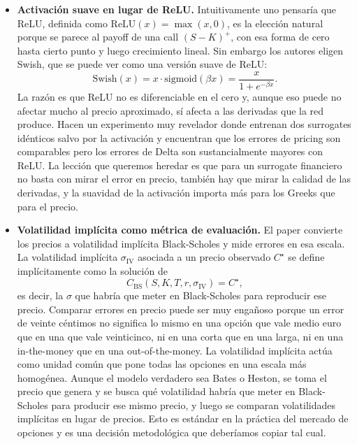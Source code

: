 \documentclass[11pt,a4paper]{article}
\begin{document}
\begin{itemize}
\item \textbf{Activación suave en lugar de ReLU.} Intuitivamente uno pensaría que ReLU, definida como $\mathrm{ReLU}(x) = \max(x, 0)$, es la elección natural porque se parece al payoff de una call $(S - K)^+$, con esa forma de cero hasta cierto punto y luego crecimiento lineal. Sin embargo los autores eligen Swish, que se puede ver como una versión suave de ReLU:
\begin{equation}
\mathrm{Swish}(x) = x \cdot \mathrm{sigmoid}(\beta x) = \frac{x}{1 + e^{-\beta x}}.
\end{equation}
La razón es que ReLU no es diferenciable en el cero y, aunque eso puede no afectar mucho al precio aproximado, sí afecta a las derivadas que la red produce. Hacen un experimento muy revelador donde entrenan dos surrogates idénticos salvo por la activación y encuentran que los errores de pricing son comparables pero los errores de Delta son sustancialmente mayores con ReLU. La lección que queremos heredar es que para un surrogate financiero no basta con mirar el error en precio, también hay que mirar la calidad de las derivadas, y la suavidad de la activación importa más para los Greeks que para el precio.

\item \textbf{Volatilidad implícita como métrica de evaluación.} El paper convierte los precios a volatilidad implícita Black-Scholes y mide errores en esa escala. La volatilidad implícita $\sigma_{\mathrm{IV}}$ asociada a un precio observado $C^\star$ se define implícitamente como la solución de
\begin{equation}
C_{\mathrm{BS}}(S, K, T, r, \sigma_{\mathrm{IV}}) = C^\star,
\end{equation}
es decir, la $\sigma$ que habría que meter en Black-Scholes para reproducir ese precio. Comparar errores en precio puede ser muy engañoso porque un error de veinte céntimos no significa lo mismo en una opción que vale medio euro que en una que vale veinticinco, ni en una corta que en una larga, ni en una in-the-money que en una out-of-the-money. La volatilidad implícita actúa como unidad común que pone todas las opciones en una escala más homogénea. Aunque el modelo verdadero sea Bates o Heston, se toma el precio que genera y se busca qué volatilidad habría que meter en Black-Scholes para producir ese mismo precio, y luego se comparan volatilidades implícitas en lugar de precios. Esto es estándar en la práctica del mercado de opciones y es una decisión metodológica que deberíamos copiar tal cual.


\end{itemize}
\end{document}
